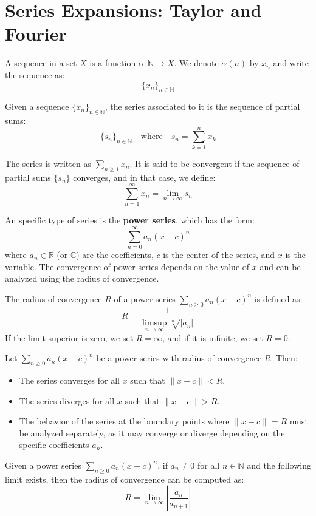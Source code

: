 \chapter{Series Expansions: Taylor and Fourier}

\begin{definicion}[Sequence]
    A sequence in a set $X$ is a function $\alpha: \mathbb{N} \to X$. We denote $\alpha(n)$ by $x_n$ and write the sequence as:
    \[
        \{x_n\}_{n\in \mathbb{N}}
    \]
\end{definicion}
\begin{definicion}[Series]
    Given a sequence $\{x_n\}_{n\in \mathbb{N}}$, the series associated to it is the sequence of partial sums:
    \[
        \{s_n\}_{n\in \mathbb{N}} \quad \text{where} \quad s_n = \sum\limits_{k=1}^n x_k
    \]

    The series is written as $\sum\limits_{n\geq 1} x_n$. It is said to be convergent if the sequence of partial sums $\{s_n\}$ converges, and in that case, we define:
    \[
        \sum\limits_{n=1}^\infty x_n = \lim_{n\to \infty} s_n
    \] 
\end{definicion}

An specific type of series is the \textbf{power series}, which has the form:
\[
    \sum\limits_{n=0}^\infty a_n (x - c)^n
\]
where $a_n\in \mathbb{R}$ (or $\mathbb{C}$) are the coefficients, $c$ is the center of the series, and $x$ is the variable. The convergence of power series depends on the value of $x$ and can be analyzed using the radius of convergence.
\begin{definicion}
    The radius of convergence $R$ of a power series $\sum\limits_{n\geq 0} a_n (x - c)^n$ is defined as:
\[
    R = \frac{1}{\limsup\limits_{n\to \infty} \sqrt[n]{|a_n|}}
\]
If the limit superior is zero, we set $R = \infty$, and if it is infinite, we set $R = 0$.
\end{definicion}
\begin{teo}
    Let $\sum\limits_{n\geq 0} a_n (x - c)^n$ be a power series with radius of convergence $R$. Then:
    \begin{itemize}
        \item The series converges for all $x$ such that $\|x - c\| < R$.
        \item The series diverges for all $x$ such that $\|x - c\| > R$.
        \item The behavior of the series at the boundary points where $\|x - c\| = R$ must be analyzed separately, as it may converge or diverge depending on the specific coefficients $a_n$.
    \end{itemize}
\end{teo}
\begin{prop}
    Given a power series $\sum\limits_{n\geq 0} a_n (x - c)^n$, if $a_n\neq 0$ for all $n\in \mathbb{N}$ and the following limit exists, then the radius of convergence can be computed as:
    \[
    R = \lim_{n\to \infty} \left|\frac{a_n}{a_{n+1}}\right|
    \]
\end{prop}

